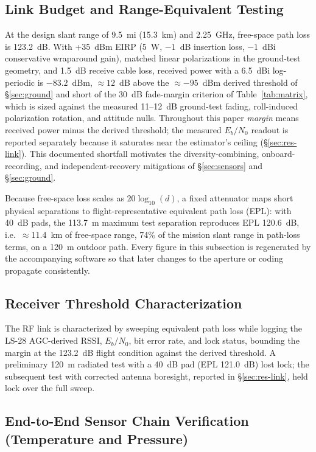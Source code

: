 \documentclass[12pt,letterpaper]{article}
\begin{document}
\subsection{Link Budget and Range-Equivalent Testing}\label{sec:linkbudget}

At the design slant range of 9.5~mi (15.3~km) and 2.25~GHz, free-space path loss is
123.2~dB. With +35~dBm EIRP (5~W, $-1$~dB insertion loss, $-1$~dBi conservative wraparound
gain), matched linear polarizations in the ground-test geometry, and 1.5~dB receive cable
loss, received power with a 6.5~dBi log-periodic is $-83.2$~dBm, ${\approx}12$~dB above
the ${\approx}{-95}$~dBm derived threshold of \S\ref{sec:ground} and short of the 30~dB
fade-margin criterion of Table~\ref{tab:matrix}, which is sized against the measured
11--12~dB ground-test fading, roll-induced polarization rotation, and attitude nulls.
Throughout this paper \emph{margin} means received power minus the derived threshold; the
measured $E_b/N_0$ readout is reported separately because it saturates near the
estimator's ceiling (\S\ref{sec:res-link}). This documented shortfall motivates the
diversity-combining, onboard-recording, and independent-recovery mitigations of
\S\ref{sec:sensors} and \S\ref{sec:ground}.

Because free-space loss scales as $20\log_{10}(d)$, a fixed attenuator maps short physical
separations to flight-representative equivalent path loss (EPL): with 40~dB pads, the
113.7~m maximum test separation reproduces EPL 120.6~dB, i.e.\ ${\approx}$11.4~km of
free-space range, 74\% of the mission slant range in path-loss terms, on a 120~m outdoor
path. Every figure in this subsection is regenerated by the accompanying software so that
later changes to the aperture or coding propagate consistently.

\subsection{Receiver Threshold Characterization}\label{sec:threshold}

The RF link is characterized by sweeping equivalent path loss while logging the LS-28
AGC-derived RSSI, $E_b/N_0$, bit error rate, and lock status, bounding the margin at the
123.2~dB flight condition against the derived threshold. A preliminary 120~m radiated test
with a 40~dB pad (EPL 121.0~dB) lost lock; the subsequent test with corrected antenna
boresight, reported in \S\ref{sec:res-link}, held lock over the full sweep.

\subsection{End-to-End Sensor Chain Verification (Temperature and Pressure)}\label{sec:endtoend}
\end{document}
